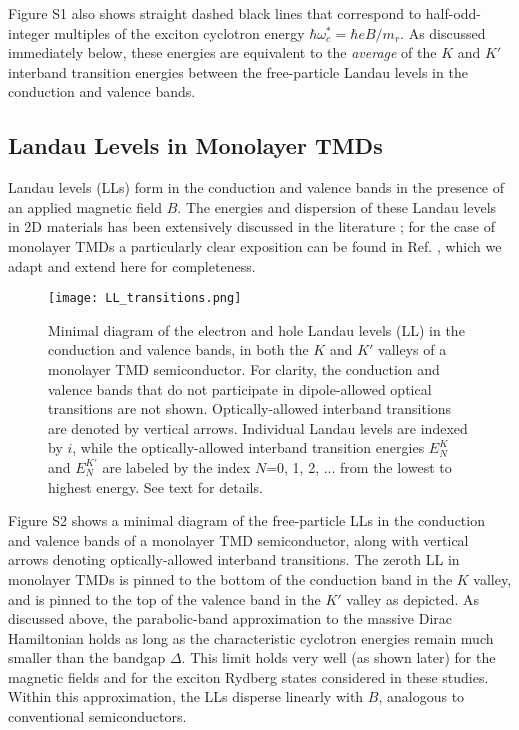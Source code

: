 \documentclass[aps,prl,twocolumn]{revtex4-1}
\begin{document}
Figure S1 also shows straight dashed black lines that correspond to half-odd-integer multiples of the exciton cyclotron energy $\hbar \omega_c^* = \hbar e B /m_r$.  As discussed immediately below, these energies are equivalent to the \textit{average} of the $K$ and $K'$ interband transition energies between the free-particle Landau levels in the conduction and valence bands. 

\subsection{Landau Levels in Monolayer TMDs}

Landau levels (LLs) form in the conduction and valence bands in the presence of an applied magnetic field $B$. The energies and dispersion of these Landau levels in 2D materials has been extensively discussed in the literature \cite{Li2, Chu, Wang_LL, Bieniek}; for the case of monolayer TMDs a particularly clear exposition can be found in Ref. \cite{Wang_LL}, which we adapt and extend here for completeness. 

\begin{figure*}[b]
\center
\texttt{[image: LL\_transitions.png]}
\caption{Minimal diagram of the electron and hole Landau levels (LL) in the conduction and valence bands, in both the $K$ and $K'$ valleys of a monolayer TMD semiconductor. For clarity, the conduction and valence bands that do not participate in dipole-allowed optical transitions are not shown. Optically-allowed interband transitions are denoted by vertical arrows. Individual Landau levels are indexed by $i$, while the optically-allowed interband transition energies $E_N^K$ and $E_N^{K'}$ are labeled by the index $N$=0, 1, 2, ... from the lowest to highest energy. See text for details.} \label{fig2}
\end{figure*}

Figure S2 shows a minimal diagram of the free-particle LLs in the conduction and valence bands of a monolayer TMD semiconductor, along with vertical arrows denoting optically-allowed interband transitions. The zeroth LL in monolayer TMDs is pinned to the bottom of the conduction band in the $K$ valley, and is pinned to the top of the valence band in the $K'$ valley as depicted.  As discussed above, the parabolic-band approximation to the massive Dirac Hamiltonian holds as long as the characteristic cyclotron energies remain much smaller than the bandgap $\Delta$.  This limit holds very well (as shown later) for the magnetic fields and for the exciton Rydberg states considered in these studies.  Within this approximation, the LLs disperse linearly with $B$, analogous to conventional semiconductors.
\end{document}
